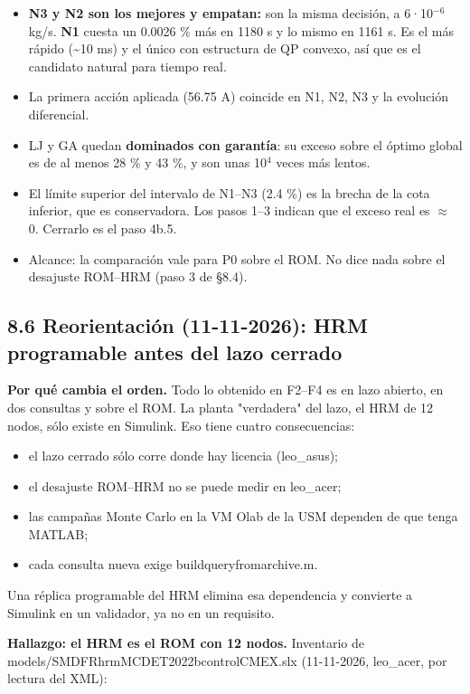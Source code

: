 \documentclass[11pt,a4paper]{article}
\newcommand{\codeus}{\textunderscore\allowbreak}
\newcommand{\code}[1]{{\small\ttfamily\let\_\codeus #1}}
\begin{document}
\begin{itemize}
\item \textbf{N3 y N2 son los mejores y empatan:} son la misma decisión, a 6·10$^{-6}$ kg/s. \textbf{N1} cuesta un 0.0026 \% más en 1180 s y lo mismo en 1161 s. Es el más rápido (\textasciitilde{}10 ms) y el único con estructura de QP convexo, así que es el candidato natural para tiempo real.
\item La primera acción aplicada (56.75 A) coincide en N1, N2, N3 y la evolución diferencial.
\item LJ y GA quedan \textbf{dominados con garantía}: su exceso sobre el óptimo global es de al menos 28 \% y 43 \%, y son unas 10$^{4}$ veces más lentos.
\item El límite superior del intervalo de N1–N3 (2.4 \%) es la brecha de la cota inferior, que es conservadora. Los pasos 1–3 indican que el exceso real es $\approx$ 0. Cerrarlo es el paso 4b.5.
\item Alcance: la comparación vale para P0 sobre el ROM. No dice nada sobre el desajuste ROM–HRM (paso 3 de \S{}8.4).
\end{itemize}

\subsection*{8.6 Reorientación (11-11-2026): HRM programable antes del lazo cerrado}
\textbf{Por qué cambia el orden.} Todo lo obtenido en F2–F4 es en lazo abierto, en dos consultas y sobre el ROM. La planta "verdadera" del lazo, el HRM de 12 nodos, sólo existe en Simulink. Eso tiene cuatro consecuencias:

\begin{itemize}
\item el lazo cerrado sólo corre donde hay licencia (leo\_asus);
\item el desajuste ROM–HRM no se puede medir en leo\_acer;
\item las campañas Monte Carlo en la VM Olab de la USM dependen de que tenga MATLAB;
\item cada consulta nueva exige \code{build\_query\_from\_archive.m}.
\end{itemize}

Una réplica programable del HRM elimina esa dependencia y convierte a Simulink en un validador, ya no en un requisito.

\textbf{Hallazgo: el HRM es el ROM con 12 nodos.} Inventario de \code{models/SMDFR\_hrm\_MCDET\_2022b\_control\_CMEX.slx} (11-11-2026, leo\_acer, por lectura del XML):
\end{document}
